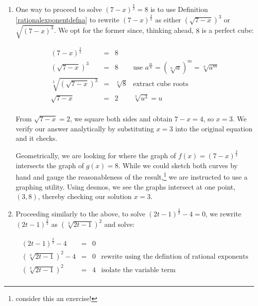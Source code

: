 \documentclass{ximera}
\begin{document}
\begin{example}
\begin{enumerate}

\item  One way to proceed to solve  $(7-x)^{\frac{3}{2}} = 8$ is to use Definition \ref{rationalexponentdefna} to rewrite $(7-x)^{\frac{3}{2}}$ as either $(\sqrt{7-x})^3$ or $\sqrt{(7-x)^3}$.  We opt for the former since, thinking ahead,  $8$ is a perfect cube: 

\[ \begin{array}{rclr}

(7-x)^{\frac{3}{2}} & = & 8 & \\

(\sqrt{7-x})^3 & = & 8 & \text{use } a^{\frac {m}{n}} = \left (\sqrt [n]{a}\right )^m = \sqrt [n]{a^m}\\

\sqrt[3]{(\sqrt{7-x})^3} & = & \sqrt[3]{8} & \text{extract cube roots}  \\

\sqrt{7-x} & = & 2 & \text{$\sqrt[3]{u^3}= u$} \\ \end{array} 
\]

From $\sqrt{7-x} =  2$, we square both sides and obtain $7-x = 4$, so $x = 3$.  We verify our answer analytically by substituting $x=3$ into the original equation and it checks.

Geometrically, we are looking for where the graph of $f(x) = (7-x)^{\frac{3}{2}}$ intersects the graph of $g(x) = 8$.  While we could sketch both curves by hand and gauge the reasonableness of the result,\footnote{consider this an exercise!} we are instructed to use a graphing utility.  Using desmos, we see the graphs intersect at one point, $(3,8)$, thereby checking our solution $x = 3$.


\begin{center}
\end{center}

\item  Proceeding similarly to the above, to solve $(2t-1)^{\frac{2}{3}} -4 = 0$, we rewrite $(2t-1)^{\frac{2}{3}}$ as $(\sqrt[3]{2t-1})^2$ and solve:

\[ \begin{array}{rclr}
(2t-1)^{\frac{2}{3}} -4  & = & 0 & \\

(\sqrt[3]{2t-1})^2 - 4 & = & 0 & \text{rewrite using the defintion of rational exponents} \\
(\sqrt[3]{2t-1})^2 & = & 4 & \text{isolate the variable term} \\


\end{array}\]
\end{enumerate}
\end{example}
\end{document}
